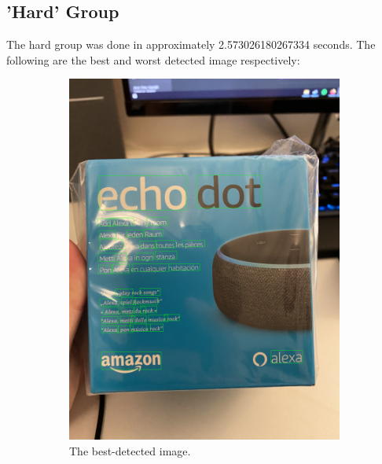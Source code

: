 \documentclass[10pt, a4paper]{article}
\begin{document}
\subsection{'Hard' Group} %
\label{sub:hard}
The hard group was done in approximately 2.573026180267334 seconds. The following are the best and worst detected image respectively:
\begin{figure}[h!]
	\centering
	\begin{subfigure}[b]{0.4\linewidth}
		\includegraphics[width=\linewidth]{jupyter/results/hard/sample_output_1.jpeg}
		\caption{The best-detected image.}
	\end{subfigure}
	\begin{subfigure}[b]{0.4\linewidth}

\end{subfigure}
\end{figure}
\end{document}
